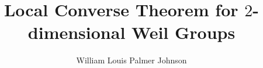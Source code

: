 \documentclass{maine-thesis}  %
\title{Local Converse Theorem for $2$-dimensional Weil Groups}					%
\author{William Louis Palmer Johnson}					%
\begin{document}
\preliminary
\titlepage






%
\end{document}
